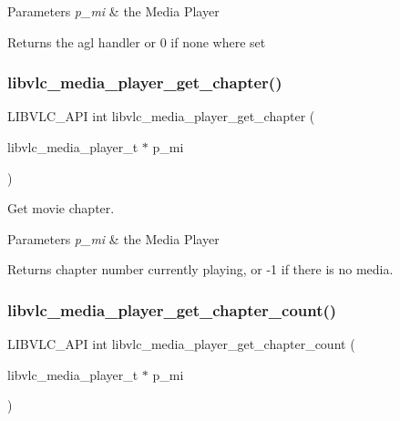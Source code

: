 \begin{DoxyParams}{Parameters}
{\em p\+\_\+mi} & the Media Player \\
\hline
\end{DoxyParams}
\begin{DoxyReturn}{Returns}
the agl handler or 0 if none where set 
\end{DoxyReturn}
\mbox{\label{group__libvlc__media__player_gabd8bdd2acfab5d780917f9afec77256a}} 
\subsubsection{\texorpdfstring{libvlc\+\_\+media\+\_\+player\+\_\+get\+\_\+chapter()}{libvlc\_media\_player\_get\_chapter()}}
{\footnotesize\ttfamily L\+I\+B\+V\+L\+C\+\_\+\+A\+PI int libvlc\+\_\+media\+\_\+player\+\_\+get\+\_\+chapter (\begin{DoxyParamCaption}\item[{libvlc\+\_\+media\+\_\+player\+\_\+t $\ast$}]{p\+\_\+mi }\end{DoxyParamCaption})}

Get movie chapter.


\begin{DoxyParams}{Parameters}
{\em p\+\_\+mi} & the Media Player \\
\hline
\end{DoxyParams}
\begin{DoxyReturn}{Returns}
chapter number currently playing, or -\/1 if there is no media. 
\end{DoxyReturn}
\mbox{\label{group__libvlc__media__player_gaca201f5b20c3e8f2aeb4b65089620a64}} 
\subsubsection{\texorpdfstring{libvlc\+\_\+media\+\_\+player\+\_\+get\+\_\+chapter\+\_\+count()}{libvlc\_media\_player\_get\_chapter\_count()}}
{\footnotesize\ttfamily L\+I\+B\+V\+L\+C\+\_\+\+A\+PI int libvlc\+\_\+media\+\_\+player\+\_\+get\+\_\+chapter\+\_\+count (\begin{DoxyParamCaption}\item[{libvlc\+\_\+media\+\_\+player\+\_\+t $\ast$}]{p\+\_\+mi }\end{DoxyParamCaption})}

